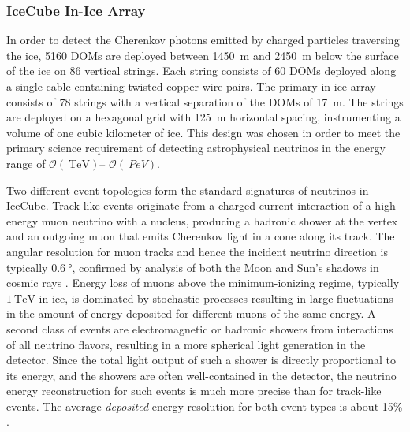 \subsubsection{IceCube In-Ice Array}

In order to detect the Cherenkov photons emitted by charged particles
traversing the ice, \num{5160} DOMs are deployed between \SI{1450}{\meter}
and \SI{2450} {\meter} below the surface of the ice on \num{86} vertical
strings. Each string consists of \num{60} DOMs deployed along a
single cable containing twisted copper-wire pairs. The 
primary in-ice array consists of \num{78} strings with a vertical
separation of the DOMs of \SI{17}{\meter}.  The strings are
deployed on a hexagonal grid with \SI{125}{\meter} horizontal spacing,
instrumenting a volume of one cubic kilometer of ice.  This design was chosen in
order to meet the primary science requirement of detecting astrophysical
neutrinos in the energy range of $\mathcal{O}(\SI{}{\tera\electronvolt})$--
$\mathcal{O}(\SI{}{PeV})$.  %

Two different event topologies form the standard signatures of neutrinos in
IceCube.  Track-like events originate from a charged current interaction of
a high-energy muon neutrino with a nucleus, producing a hadronic shower at
the vertex and an outgoing muon that emits Cherenkov light in a cone along its
track.  The angular resolution for muon tracks and hence the incident
neutrino direction is typically $\SI{0.6}{\degree}$, confirmed by analysis of both the Moon and Sun's shadows
in cosmic rays \cite{IC3:moon,IC3:sun}. Energy loss of muons above the
minimum-ionizing regime, typically $\SI{1}{\tera\electronvolt}$ in ice, is
dominated by stochastic 
processes resulting in large fluctuations in the amount of energy deposited
for different muons of the same energy.  A second class of events are
electromagnetic or hadronic showers from interactions of all neutrino
flavors, resulting in a more spherical light generation in the detector.
Since the total light output of such a shower is directly proportional to its energy, and
the showers are often well-contained in the detector, the neutrino energy
reconstruction for such events is much more precise than for track-like
events. The average \emph{deposited} energy resolution for both event types
is about 15\% \cite{IC3:ereco}.

